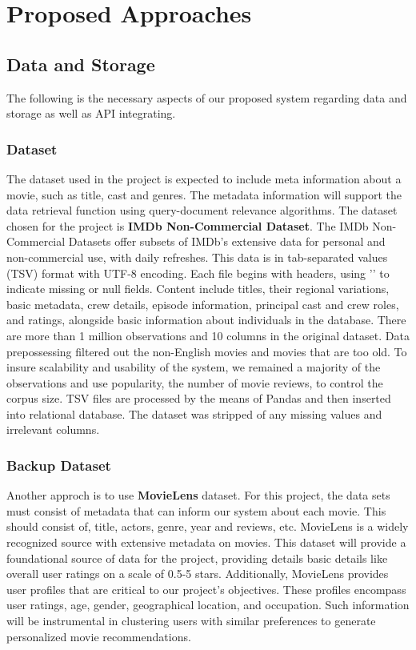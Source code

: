 \documentclass[journal]{IEEEtran}
\theoremstyle{mydefstyle}
\begin{document}
\section{Proposed Approaches}
\subsection{Data and Storage}
The following is the necessary aspects of our proposed system regarding data and storage as well as API integrating.

\subsubsection{Dataset}
The dataset used in the project is expected to include meta information about a movie, such as title, cast and genres. The metadata information will support the data retrieval function using query-document relevance algorithms. The dataset chosen for the project is \textbf{IMDb Non-Commercial Dataset}. The IMDb Non-Commercial Datasets offer subsets of IMDb's extensive data for personal and non-commercial use, with daily refreshes. This data is in tab-separated values (TSV) format with UTF-8 encoding. Each file begins with headers, using '\N' to indicate missing or null fields. Content include titles, their regional variations, basic metadata, crew details, episode information, principal cast and crew roles, and ratings, alongside basic information about individuals in the database. There are more than 1 million observations and 10 columns in the original dataset. Data prepossessing filtered out the non-English movies and movies that are too old. To insure scalability and usability of the system, we remained a majority of the observations and use popularity, the number of movie reviews, to control the corpus size. TSV files are processed by the means of Pandas and then inserted into relational database. The dataset was stripped of any missing values and irrelevant columns. 

\subsubsection{Backup Dataset}
Another approch is to use \textbf{MovieLens} dataset. For this project, the data sets must consist of metadata that can inform our system about each movie. This should consist of, title, actors, genre, year and reviews, etc. MovieLens is a widely recognized source with extensive metadata on movies. This dataset will provide a foundational source of data for the project, providing details basic details like overall user ratings on a scale of 0.5-5 stars. Additionally, MovieLens provides user profiles that are critical to our project's objectives. These profiles encompass user ratings, age, gender, geographical location, and occupation. Such information will be instrumental in clustering users with similar preferences to generate personalized movie recommendations.
\end{document}

